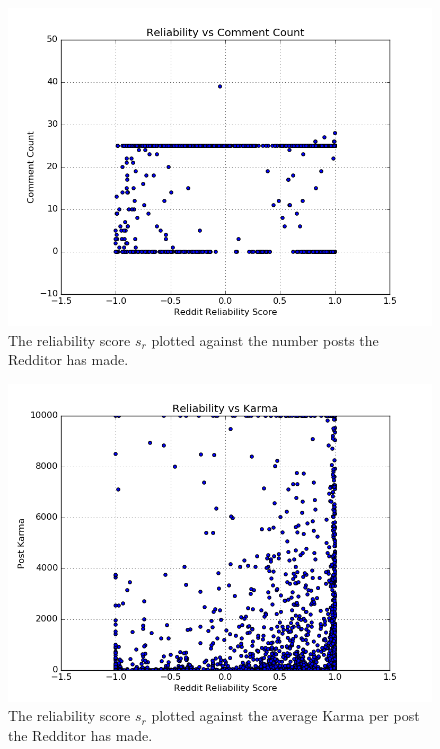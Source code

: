 \begin{figure}[tb]
    \centering
    \includegraphics[width=\linewidth]{figures/reliability_comment_count.png}
    \caption{The reliability score $s_r$ plotted against the number posts the Redditor has made.}
    \label{fig:reliability_comment_count}
\end{figure}

\begin{figure}[tb]
    \centering
    \includegraphics[width=\linewidth]{figures/reliability_post_karma.png}
    \caption{The reliability score $s_r$ plotted against the average Karma per post the Redditor has made.}
    \label{fig:reliability_post_karma}
\end{figure}

